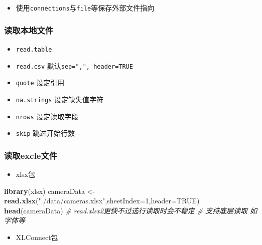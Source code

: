 \documentclass[
]{book}
\newenvironment{Shaded}{\begin{snugshade}}{\end{snugshade}}
\newcommand{\CommentTok}[1]{\textcolor[rgb]{0.56,0.35,0.01}{\textit{#1}}}
\newcommand{\DataTypeTok}[1]{\textcolor[rgb]{0.13,0.29,0.53}{#1}}
\newcommand{\DecValTok}[1]{\textcolor[rgb]{0.00,0.00,0.81}{#1}}
\newcommand{\KeywordTok}[1]{\textcolor[rgb]{0.13,0.29,0.53}{\textbf{#1}}}
\newcommand{\NormalTok}[1]{#1}
\newcommand{\OtherTok}[1]{\textcolor[rgb]{0.56,0.35,0.01}{#1}}
\newcommand{\StringTok}[1]{\textcolor[rgb]{0.31,0.60,0.02}{#1}}
\providecommand{\tightlist}{%
  \setlength{\itemsep}{0pt}\setlength{\parskip}{0pt}}
\begin{document}
\begin{itemize}
\tightlist
\item
  使用\texttt{connections}与\texttt{file}等保存外部文件指向
\end{itemize}

\hypertarget{ux8bfbux53d6ux672cux5730ux6587ux4ef6}{%
\subsubsection{读取本地文件}\label{ux8bfbux53d6ux672cux5730ux6587ux4ef6}}

\begin{itemize}
\tightlist
\item
  \texttt{read.table}
\item
  \texttt{read.csv} 默认\texttt{sep=",",\ header=TRUE}
\item
  \texttt{quote} 设定引用
\item
  \texttt{na.strings} 设定缺失值字符
\item
  \texttt{nrows} 设定读取字段
\item
  \texttt{skip} 跳过开始行数
\end{itemize}

\hypertarget{ux8bfbux53d6excleux6587ux4ef6}{%
\subsubsection{读取excle文件}\label{ux8bfbux53d6excleux6587ux4ef6}}

\begin{itemize}
\tightlist
\item
  xlsx包
\end{itemize}

\begin{Shaded}
\begin{Highlighting}[]
\KeywordTok{library}\NormalTok{(xlsx)}
\NormalTok{cameraData <-}\StringTok{ }\KeywordTok{read.xlsx}\NormalTok{(}\StringTok{"./data/cameras.xlsx"}\NormalTok{,}\DataTypeTok{sheetIndex=}\DecValTok{1}\NormalTok{,}\DataTypeTok{header=}\OtherTok{TRUE}\NormalTok{)}
\KeywordTok{head}\NormalTok{(cameraData)}
\CommentTok{# read.xlsx2更快不过选行读取时会不稳定}
\CommentTok{# 支持底层读取 如字体等}
\end{Highlighting}
\end{Shaded}

\begin{itemize}
\tightlist
\item
  XLConnect包
\end{itemize}
\end{document}
